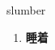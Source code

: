 
\begin{frame}
{\huge slumber}
\begin{center}
\begin{enumerate}\Large
  \item \textbf{睡着}
\end{enumerate}
\end{center}
\end{frame}
